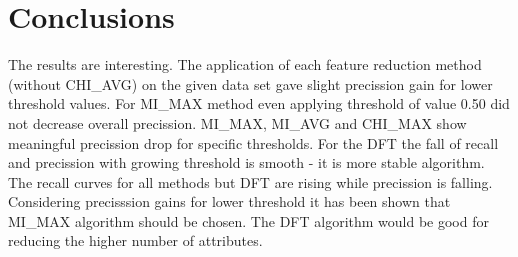 \documentclass[12pt,a4paper]{report}
\begin{document}
\chapter{Conclusions}
The results are interesting. The application of each feature reduction method (without CHI\_AVG) on the given data set gave slight precission gain for lower threshold values. For MI\_MAX method even applying threshold of value 0.50 did not decrease overall precission. MI\_MAX, MI\_AVG and CHI\_MAX show meaningful precission drop for specific thresholds. For the DFT the fall of recall and precission with growing threshold is smooth - it is more stable algorithm. The recall curves for all methods but DFT are rising while precission is falling. Considering precisssion gains for lower threshold it has been shown that MI\_MAX algorithm should be chosen. The DFT algorithm would be good for reducing the higher number of attributes.
\end{document}
